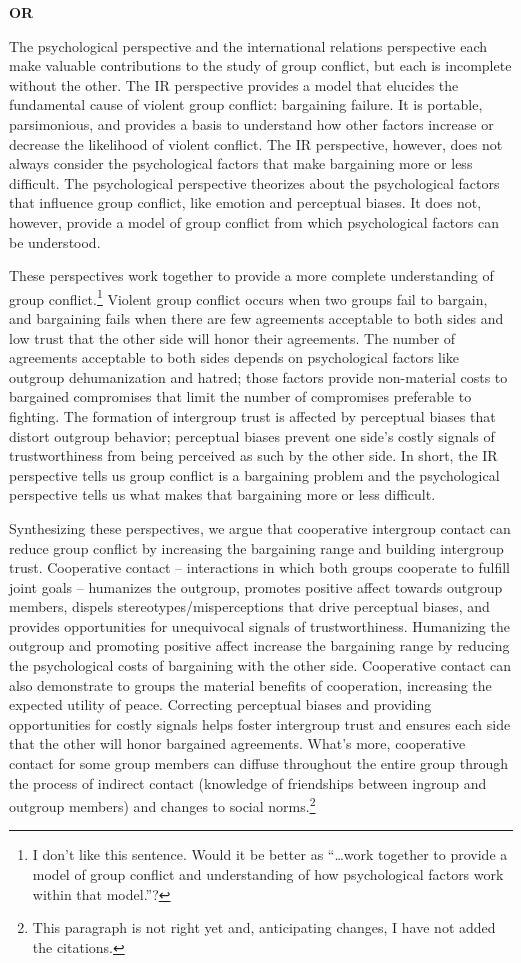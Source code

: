 \documentclass[11pt]{article}
\begin{document}
\textbf{OR}

The psychological perspective and the international relations
perspective each make valuable contributions to the study of group
conflict, but each is incomplete without the other. The IR perspective
provides a model that elucides the fundamental cause of violent group
conflict: bargaining failure. It is portable, parsimonious, and provides
a basis to understand how other factors increase or decrease the
likelihood of violent conflict. The IR perspective, however, does not
always consider the psychological factors that make bargaining more or
less difficult. The psychological perspective theorizes about the
psychological factors that influence group conflict, like emotion and
perceptual biases. It does not, however, provide a model of group
conflict from which psychological factors can be understood.

These perspectives work together to provide a more complete
understanding of group conflict.\footnote{I don't like this sentence.
  Would it be better as ``\ldots{}work together to provide a model of
  group conflict and understanding of how psychological factors work
  within that model.''?} Violent group conflict occurs when two groups
fail to bargain, and bargaining fails when there are few agreements
acceptable to both sides and low trust that the other side will honor
their agreements. The number of agreements acceptable to both sides
depends on psychological factors like outgroup dehumanization and
hatred; those factors provide non-material costs to bargained
compromises that limit the number of compromises preferable to fighting.
The formation of intergroup trust is affected by perceptual biases that
distort outgroup behavior; perceptual biases prevent one side's costly
signals of trustworthiness from being perceived as such by the other
side. In short, the IR perspective tells us group conflict is a
bargaining problem and the psychological perspective tells us what makes
that bargaining more or less difficult.

Synthesizing these perspectives, we argue that cooperative intergroup
contact can reduce group conflict by increasing the bargaining range and
building intergroup trust. Cooperative contact -- interactions in which
both groups cooperate to fulfill joint goals -- humanizes the outgroup,
promotes positive affect towards outgroup members, dispels
stereotypes/misperceptions that drive perceptual biases, and provides
opportunities for unequivocal signals of trustworthiness. Humanizing the
outgroup and promoting positive affect increase the bargaining range by
reducing the psychological costs of bargaining with the other side.
Cooperative contact can also demonstrate to groups the material benefits
of cooperation, increasing the expected utility of peace. Correcting
perceptual biases and providing opportunities for costly signals helps
foster intergroup trust and ensures each side that the other will honor
bargained agreements. What's more, cooperative contact for some group
members can diffuse throughout the entire group through the process of
indirect contact (knowledge of friendships between ingroup and outgroup
members) and changes to social norms.\footnote{This paragraph is not
  right yet and, anticipating changes, I have not added the citations.}
\end{document}
